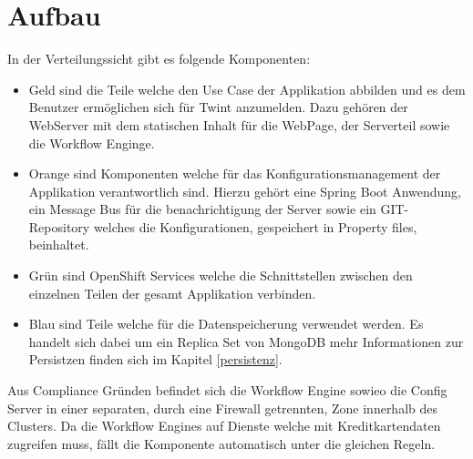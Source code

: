 \section{Aufbau}

In der Verteilungssicht gibt es folgende Komponenten:\newline
\begin{itemize}
	\item Geld sind die Teile welche den Use Case der Applikation abbilden und es dem Benutzer ermöglichen sich für Twint anzumelden. Dazu gehören der WebServer mit dem statischen Inhalt für die WebPage, der Serverteil sowie die Workflow Enginge.
	\item Orange sind Komponenten welche für das Konfigurationsmanagement der Applikation verantwortlich sind. Hierzu gehört eine Spring Boot Anwendung, ein Message Bus für die benachrichtigung der Server sowie ein GIT-Repository welches die Konfigurationen, gespeichert in Property files, beinhaltet.
	\item Grün sind OpenShift Services welche die Schnittstellen zwischen den einzelnen Teilen der gesamt Applikation verbinden.
	\item Blau sind Teile welche für die Datenspeicherung verwendet werden. Es handelt sich dabei um ein Replica Set von MongoDB mehr Informationen zur Persistzen finden sich im Kapitel \ref{persistenz}.
\end{itemize}

Aus Compliance Gründen befindet sich die Workflow Engine sowieo die Config Server in einer separaten, durch eine Firewall getrennten, Zone innerhalb des Clusters. Da die Workflow Engines auf Dienste welche mit Kreditkartendaten zugreifen muss, fällt die Komponente automatisch unter die gleichen Regeln. 

